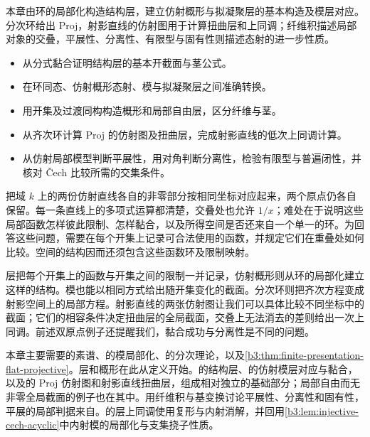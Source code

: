 

\begin{chapterabstract}
	本章由环的局部化构造结构层，建立仿射概形与拟凝聚层的基本构造及模层对应。分次环给出 Proj，射影直线的仿射图用于计算扭曲层和上同调；纤维积描述局部对象的交叠，平展性、分离性、有限型与固有性则描述态射的进一步性质。
\end{chapterabstract}

\begin{learninggoals}
	\begin{itemize}
		\item 从分式黏合证明结构层的基本开截面与茎公式。
		\item 在环同态、仿射概形态射、模与拟凝聚层之间准确转换。
		\item 用开集及过渡同构构造概形和局部自由层，区分纤维与茎。
		\item 从齐次环计算 Proj 的仿射图及扭曲层，完成射影直线的低次上同调计算。
		\item 从仿射局部模型判断平展性，用对角判断分离性，检验有限型与普遍闭性，并核对 Čech 比较所需的交集条件。
	\end{itemize}
\end{learninggoals}

把域 \(k\) 上的两份仿射直线各自的非零部分按相同坐标对应起来，两个原点仍各自保留。每一条直线上的多项式运算都清楚，交叠处也允许 \(1/x\)；难处在于说明这些局部函数怎样彼此限制、怎样黏合，以及所得空间是否还来自一个单一的环。为回答这些问题，需要在每个开集上记录可合法使用的函数，并规定它们在重叠处如何比较。空间的结构因而还须包含这些函数环及限制映射。

\ProseParagraphBreak

层把每个开集上的函数与开集之间的限制一并记录，仿射概形则从环的局部化建立这样的结构。模也能以相同方式给出随开集变化的截面。分次环则把齐次方程变成射影空间上的局部方程。射影直线的两张仿射图让我们可以具体比较不同坐标中的截面；它们的相容条件决定扭曲层的全局截面，交叠上无法消去的差则给出一次上同调。前述双原点例子还提醒我们，黏合成功与分离性是不同的问题。

\ProseParagraphBreak

本章主要需要的素谱、的模局部化、的分次理论，以及\cref{b3:thm:finite-presentation-flat-projective}。层和概形在此从定义开始。的结构层、的仿射模层对应与黏合，以及的 Proj 仿射图和射影直线扭曲层，组成相对独立的基础部分；局部自由而无非零全局截面的例子也在其中。用纤维积与基变换讨论平展性、分离性和固有性，平展的局部判据来自。的层上同调使用复形与内射消解，并回用\cref{b3:lem:injective-cech-acyclic}中内射模的局部化与支集挠子性质。


